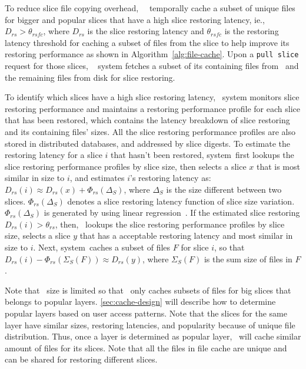 

To reduce slice file copying overhead,
\sysname~\filecachename~temporally cache a subset of unique files for bigger and popular slices that have a high slice restoring latency, ie., $D_{rs} > \theta_{rsfc}$, 
where $D_{rs}$ is the slice restoring latency and $\theta_{rsfc}$ is the restoring latency threshold for 
caching
a subset of files from the slice to help improve its restoring performance as shown in Algorithm~\ref{alg:file-cache}.
Upon a \texttt{pull slice} request for those slices, 
\dedupname~ system fetches a subset of its containing files from \filecachename~and
the remaining files from disk for slice restoring.

To identify which slices have a high slice restoring latency,
\dedupname~system monitors slice restoring performance and 
maintains a restoring performance  profile for each slice that has been restored,
which contains the latency breakdown of slice restoring
and its containing files' sizes.
All the slice restoring performance profiles are also stored in distributed  databases,
 and addressed by slice digests. 
To estimate the restoring latency for a slice $i$ that hasn't been restored, 
\dedupname system~first lookups the slice restoring performance profiles by slice size,
 then selects a slice $x$ that is most similar in size to $i$,
 and estimates $i$'s restoring latency as: 
 $D_{rs}(i) \approx D_{rs}(x) + \Phi_{rs}(\Delta_{S})$,
 where $\Delta_{S}$ is the size different between two slices.
 $\Phi_{rs}(\Delta_{S})$ denotes a slice restoring latency function of slice size variation.
  $\Phi_{rs}(\Delta_{S})$ is generated by using linear regression~\cite{xxx}.
If the estimated slice restoring $D_{rs}(i) > \theta_{rs}$,
then, \dedupname~lookups the slice restoring performance profiles by slice size,
selects a slice $y$ that has a acceptable restoring latency and
most similar in size to $i$.
Next, \dedupname system~caches a subset of files $F$ for slice $i$, so that
$D_{rs}(i) - \Phi_{rs}(\Sigma_{S}(F)) \approx D_{rs}(y)$,
where $\Sigma_{S}(F)$ is the sum size of files in $F$.

Note that \filecachename~size is limited so that \filecachename~only caches 
subsets of files for big slices that belongs to popular layers.
\cref{sec:cache-design} will describe how to determine popular layers based on user access patterns.
Note that the slices for the same layer have similar sizes, restoring latencies, and popularity 
because of unique file
distribution. 
Thus, once a layer is determined as popular layer, 
\dedupname~will cache similar amount of files for its slices.
Note that all the files in file cache are unique and can be shared for restoring different slices.

